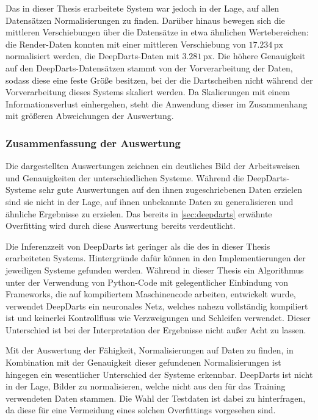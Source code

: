 Das in dieser Thesis erarbeitete System war jedoch in der Lage, auf allen Datensätzen Normalisierungen zu finden. Darüber hinaus bewegen sich die mittleren Verschiebungen über die Datensätze in etwa ähnlichen Wertebereichen: die Render-Daten konnten mit einer mittleren Verschiebung von $17.234\,\text{px}$ normalisiert werden, die DeepDarts-Daten mit $3.281\,\text{px}$. Die höhere Genauigkeit auf den DeepDarts-Datensätzen stammt von der Vorverarbeitung der Daten, sodass diese eine feste Größe besitzen, bei der die Dartscheiben nicht während der Vorverarbeitung dieses Systems skaliert werden. Da Skalierungen mit einem Informationsverlust einhergehen, steht die Anwendung dieser im Zusammenhang mit größeren Abweichungen der Auswertung.

\subsubsection{Zusammenfassung der Auswertung} %

Die dargestellten Auswertungen zeichnen ein deutliches Bild der Arbeitsweisen und Genauigkeiten der unterschiedlichen Systeme. Während die DeepDarts-Systeme sehr gute Auswertungen auf den ihnen zugeschriebenen Daten erzielen sind sie nicht in der Lage, auf ihnen unbekannte Daten zu generalisieren und ähnliche Ergebnisse zu erzielen. Das bereits in \autoref{sec:deepdarts} erwähnte Overfitting wird durch diese Auswertung bereits verdeutlicht.

Die Inferenzzeit von DeepDarts ist geringer als die des in dieser Thesis erarbeiteten Systems. Hintergründe dafür können in den Implementierungen der jeweiligen Systeme gefunden werden. Während in dieser Thesis ein Algorithmus unter der Verwendung von Python-Code mit gelegentlicher Einbindung von Frameworks, die auf kompiliertem Maschinencode arbeiten, entwickelt wurde, verwendet DeepDarts ein neuronales Netz, welches nahezu vollständig kompiliert ist und keinerlei Kontrollfluss wie Verzweigungen und Schleifen verwendet. Dieser Unterschied ist bei der Interpretation der Ergebnisse nicht außer Acht zu lassen.

Mit der Auswertung der Fähigkeit, Normalisierungen auf Daten zu finden, in Kombination mit der Genauigkeit dieser gefundenen Normalisierungen ist hingegen ein wesentlicher Unterschied der Systeme erkennbar. DeepDarts ist nicht in der Lage, Bilder zu normalisieren, welche nicht aus den für das Training verwendeten Daten stammen. Die Wahl der Testdaten ist dabei zu hinterfragen, da diese für eine Vermeidung eines solchen Overfittings vorgesehen sind.

